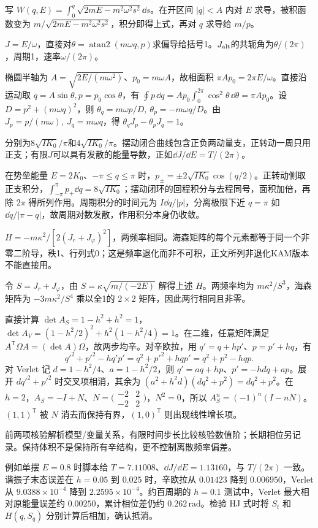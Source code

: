 \begin{bookexercises}
写 $W(q,E)=\int_0^q\sqrt{2mE-m^2\omega^2s^2}\dd s$。在开区间 $|q|<A$ 内对 $E$ 求导，被积函数变为 $m/\sqrt{2mE-m^2\omega^2s^2}$，积分即得上式，再对 $q$ 求导给 $m/p$。
\item $J=E/\omega$，直接对$\theta=\operatorname{atan2}(m\omega q,p)$求偏导给括号1。$J_{\rm alt}$的共轭角为$\theta/(2\pi)$，周期1，速率$\omega/(2\pi)$。

椭圆半轴为 $A=\sqrt{2E/(m\omega^2)}$、$p_0=m\omega A$，故相面积 $\pi A p_0=2\pi E/\omega$。直接沿运动取 $q=A\sin\theta,p=p_0\cos\theta$，有 $\oint p\,\dd q=A p_0\int_0^{2\pi}\cos^2\theta\,\dd\theta=\pi A p_0$。设 $D=p^2+(m\omega q)^2$，则 $\theta_q=m\omega p/D,\ \theta_p=-m\omega q/D$。由 $J_p=p/(m\omega),\ J_q=m\omega q$，得 $\theta_qJ_p-\theta_pJ_q=1$。
\item 分别为$8\sqrt{IK_0}/\pi$和$4\sqrt{IK_0}/\pi$。摆动闭合曲线包含正负两动量支，正转动一周只用正支；有限$J$可以具有发散的能量导数，正如$\dd J/\dd E=T/(2\pi)$。

在势垒能量 $E=2K_0$、$-\pi\le q\le\pi$ 时，$p_\pm=\pm2\sqrt{IK_0}\cos(q/2)$。正转动侧取正支积分，$\int_{-\pi}^{\pi}p_+\dd q=8\sqrt{IK_0}$；摆动闭环的回程积分与去程同号，面积加倍，再除 $2\pi$ 得所列作用。周期积分的时间元为 $I\dd q/|p|$，分离极限下近 $q=\pi$ 如 $\dd q/|\pi-q|$，故周期对数发散，作用积分本身仍收敛。
\item $H=-m\kappa^2/[2(J_r+J_\varphi)^2]$，两频率相同。海森矩阵的每个元素都等于同一个非零二阶导，秩1、行列式0；这是频率退化而非不可积，正文所列非退化KAM版本不能直接用。

令 $S=J_r+J_\varphi$，由 $S=\kappa\sqrt{m/(-2E)}$ 解得上述 $H$。两频率均为 $m\kappa^2/S^3$，海森矩阵为 $-3m\kappa^2/S^4$ 乘以全1的 $2\times2$ 矩阵，因此两行相同且非零。
\item 直接计算 $\det A_S=1-h^2+h^2=1$，$\det A_V=(1-h^2/2)^2+h^2(1-h^2/4)=1$。在二维，任意矩阵满足 $A^{\mathsf T}\Omega A=(\det A)\Omega$，故两步均辛。对辛欧拉，用 $q'=q+hp'$、$p=p'+hq$，有
\[
q'^2+p'^2-hq'p'=q^2+p'^2+hqp'=q^2+p^2-hqp.
\]
对 Verlet 记 $d=1-h^2/4$、$a=1-h^2/2$，则 $q'=aq+hp$、$p'=-hdq+ap$。展开 $dq'^2+p'^2$ 时交叉项相消，其余为 $(a^2+h^2d)(dq^2+p^2)=dq^2+p^2$。在 $h=2$，$A_S=-I+N$、$N=\bigl(\begin{smallmatrix}-2&2\\-2&2\end{smallmatrix}\bigr)$，$N^2=0$，所以 $A_S^n=(-1)^n(I-nN)$。$(1,1)^{\mathsf T}$ 被 $N$ 消去而保持有界，$(1,0)^{\mathsf T}$ 则出现线性增长项。
\item 前两项核验解析模型/变量关系，有限时间步长比较核验数值阶；长期相位另记录。保持体积不是保持所有辛结构，更不控制离散频率偏差。

例如单摆 $E=0.8$ 时脚本给 $T=7.11008$、$\dd J/\dd E=1.13160$，与 $T/(2\pi)$ 一致。谐振子末态误差在 $h=0.05$ 到 $0.025$ 时，辛欧拉从 $0.01423$ 降到 $0.006950$，Verlet 从 $9.0388\times10^{-4}$ 降到 $2.2595\times10^{-4}$。约百周期的 $h=0.1$ 测试中，Verlet 最大相对原能量误差约 $0.00250$，累计相位差仍约 $0.262\,\mathrm{rad}$。检验 HJ 式时将 $S_t$ 和 $H(q,S_q)$ 分别计算后相加，确认抵消。
\end{bookexercises}

